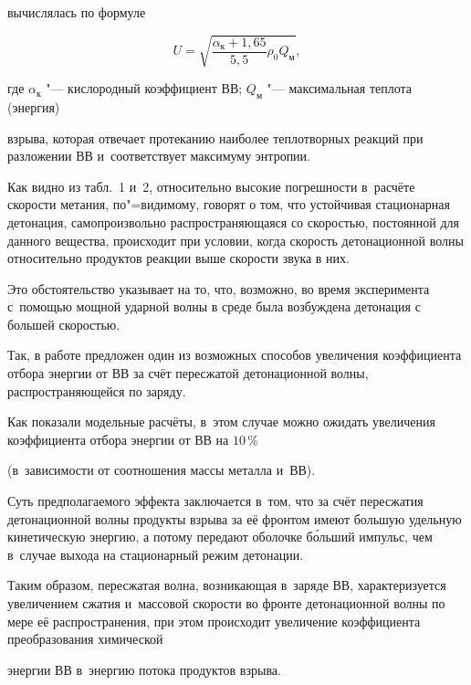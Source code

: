 вычислялась по формуле \cite{reut1:bib9}

$$

U=\sqrt {\frac{\alpha_{\text{к}}+1,65}{5,5}\rho _0 Q_{\text{м}}},

$$

где $\alpha_{\text{к}}$ "--- кислородный коэффициент ВВ; $Q_{\text{м}}$ "--- максимальная теплота (энергия)

взрыва, которая отвечает протеканию наиболее теплотворных реакций при разложении ВВ и~соответствует максимуму энтропии.







\smallskip




Как видно из табл.~1 и~2, относительно высокие погрешности в~расчёте скорости метания, по"=видимому, говорят о том, что устойчивая стационарная детонация, самопроизвольно распространяющаяся со скоростью, постоянной для данного вещества, происходит при условии, когда скорость детонационной волны относительно продуктов реакции выше скорости звука в них. 

Это обстоятельство указывает на то, что, возможно, во время эксперимента с~помощью мощной ударной волны  в среде была возбуждена  детонация с большей скоростью.

Так, в работе \cite{reut1:bib10} предложен один из возможных способов увеличения коэффициента отбора энергии от ВВ за счёт пересжатой детонационной волны, распространяющейся по заряду. 

Как показали модельные расчёты, в~этом случае можно ожидать увеличения коэффициента отбора энергии от ВВ на $10$\,{\%} 

(в~зависимости от соотношения массы металла и~ВВ). 

Суть предполагаемого эффекта заключается в~том, что за счёт пересжатия детонационной волны продукты взрыва за её фронтом имеют большую удельную кинетическую энергию, а потому передают оболочке б{\'о}льший импульс, чем в~случае выхода на стационарный режим детонации. 

Таким образом, пересжатая волна, возникающая в~заряде ВВ, характеризуется увеличением сжатия и~массовой скорости во фронте детонационной волны по мере её распространения, при этом происходит увеличение коэффициента преобразования химической

энергии ВВ в~энергию потока продуктов взрыва.



